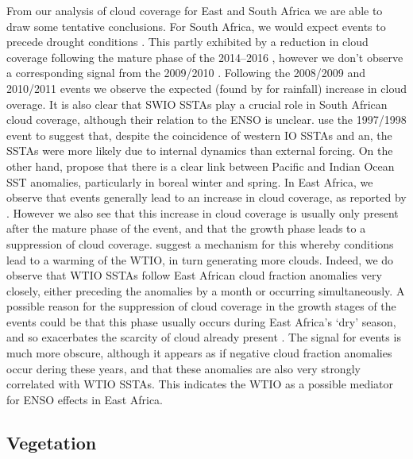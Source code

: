 From our analysis of cloud coverage for East and South Africa we are
able to draw some tentative conclusions. For South Africa, we would
expect \elnino{} events to precede drought conditions
\cite{TODO}. This partly exhibited by a reduction in cloud coverage
following the mature phase of the 2014--2016 \elnino{}, however we
don't observe a corresponding signal from the 2009/2010
\elnino{}. Following the 2008/2009 and 2010/2011 \nina{} events we
observe the expected (found by \cite{nicholson2000} for rainfall)
increase in cloud overage. It is also clear that SWIO SSTAs play a
crucial role in South African cloud coverage, although their relation
to the ENSO is unclear. \cite{webster1999} use the 1997/1998 \elnino{}
event to suggest that, despite the coincidence of western IO SSTAs and
an, the SSTAs were more likely due to internal dynamics than external
forcing. On the other hand, \cite{alexander2002} propose that there is
a clear link between Pacific and Indian Ocean SST anomalies,
particularly in boreal winter and spring. In East Africa, we observe
that \elnino{} events generally lead to an increase in cloud coverage,
as reported by \cite{TODO}. However we also see that this increase in
cloud coverage is usually only present after the mature phase of the
\elnino{} event, and that the growth phase leads to a suppression of
cloud coverage. \cite{parhi2016} suggest a mechanism for this whereby
\elnino{} conditions lead to a warming of the WTIO, in turn generating
more clouds. Indeed, we do observe that WTIO SSTAs follow East African
cloud fraction anomalies very closely, either preceding the anomalies
by a month or occurring simultaneously. A possible reason for the
suppression of cloud coverage in the growth stages of the \elnino{}
events could be that this phase usually occurs during East Africa's
`dry' season, and so exacerbates the scarcity of cloud already present
\cite{TODO}. The signal for \nina{} events is much more obscure,
although it appears as if negative cloud fraction anomalies occur
dering these years, and that these anomalies are also very strongly
correlated with WTIO SSTAs. This indicates the WTIO as a possible
mediator for ENSO effects in East Africa.

\subsection{Vegetation} 

